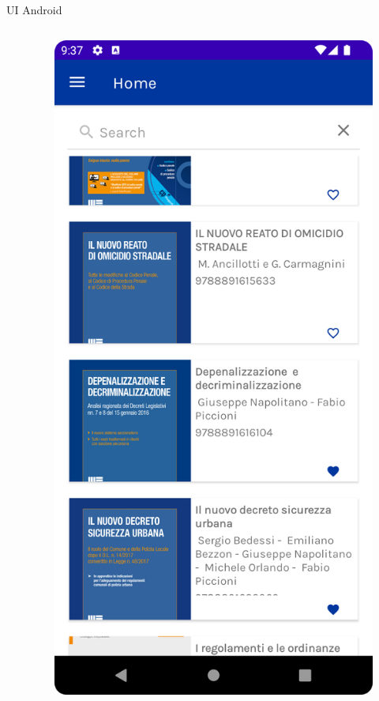 \begin{frame}{UI Android}
\begin{columns}[onlytextwidth]
\begin{column}{0.24\textwidth}
        \end{column}
        \begin{column}{0.24\textwidth}
        
             \begin{figure}[H]
                \includegraphics[width=1\textwidth]{img/home.png}
            \end{figure}
            

\end{column}
\end{columns}
\end{frame}
